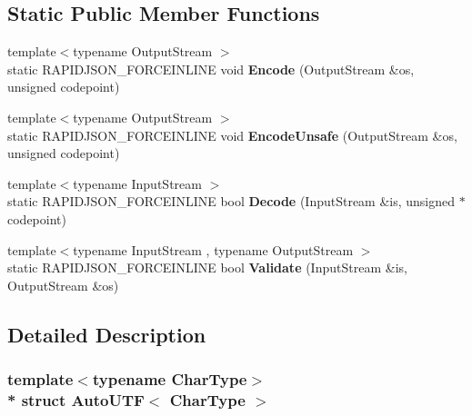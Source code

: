\subsection*{Static Public Member Functions}
\begin{DoxyCompactItemize}
\item 
{\footnotesize template$<$typename Output\+Stream $>$ }\\static R\+A\+P\+I\+D\+J\+S\+O\+N\+\_\+\+F\+O\+R\+C\+E\+I\+N\+L\+I\+NE void {\bfseries Encode} (Output\+Stream \&os, unsigned codepoint)\hypertarget{structAutoUTF_a414946115261f886e74dd42cb4b98781}{}\label{structAutoUTF_a414946115261f886e74dd42cb4b98781}

\item 
{\footnotesize template$<$typename Output\+Stream $>$ }\\static R\+A\+P\+I\+D\+J\+S\+O\+N\+\_\+\+F\+O\+R\+C\+E\+I\+N\+L\+I\+NE void {\bfseries Encode\+Unsafe} (Output\+Stream \&os, unsigned codepoint)\hypertarget{structAutoUTF_a05f5dcd1f153b61b763e44ed452de251}{}\label{structAutoUTF_a05f5dcd1f153b61b763e44ed452de251}

\item 
{\footnotesize template$<$typename Input\+Stream $>$ }\\static R\+A\+P\+I\+D\+J\+S\+O\+N\+\_\+\+F\+O\+R\+C\+E\+I\+N\+L\+I\+NE bool {\bfseries Decode} (Input\+Stream \&is, unsigned $\ast$codepoint)\hypertarget{structAutoUTF_aa5e3c1dc23dbb75f6442ff69500a35b0}{}\label{structAutoUTF_aa5e3c1dc23dbb75f6442ff69500a35b0}

\item 
{\footnotesize template$<$typename Input\+Stream , typename Output\+Stream $>$ }\\static R\+A\+P\+I\+D\+J\+S\+O\+N\+\_\+\+F\+O\+R\+C\+E\+I\+N\+L\+I\+NE bool {\bfseries Validate} (Input\+Stream \&is, Output\+Stream \&os)\hypertarget{structAutoUTF_a36dd6f226d6a07c12161e21c0aff20b1}{}\label{structAutoUTF_a36dd6f226d6a07c12161e21c0aff20b1}

\end{DoxyCompactItemize}


\subsection{Detailed Description}
\subsubsection*{template$<$typename Char\+Type$>$\\*
struct Auto\+U\+T\+F$<$ Char\+Type $>$}

